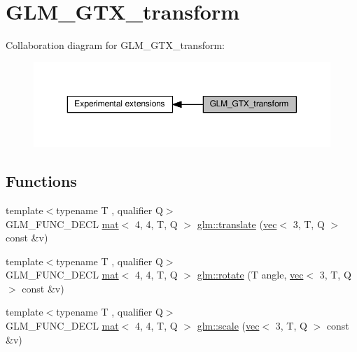 \hypertarget{group__gtx__transform}{}\section{G\+L\+M\+\_\+\+G\+T\+X\+\_\+transform}
\label{group__gtx__transform}
Collaboration diagram for G\+L\+M\+\_\+\+G\+T\+X\+\_\+transform\+:
\nopagebreak
\begin{figure}[H]
\begin{center}
\leavevmode
\includegraphics[width=350pt]{d5/da3/group__gtx__transform}
\end{center}
\end{figure}
\subsection*{Functions}
\begin{DoxyCompactItemize}
\item 
{\footnotesize template$<$typename T , qualifier Q$>$ }\\G\+L\+M\+\_\+\+F\+U\+N\+C\+\_\+\+D\+E\+CL \hyperlink{structglm_1_1mat}{mat}$<$ 4, 4, T, Q $>$ \hyperlink{group__gtx__transform_ga309a30e652e58c396e2c3d4db3ee7658}{glm\+::translate} (\hyperlink{structglm_1_1vec}{vec}$<$ 3, T, Q $>$ const \&v)
\item 
{\footnotesize template$<$typename T , qualifier Q$>$ }\\G\+L\+M\+\_\+\+F\+U\+N\+C\+\_\+\+D\+E\+CL \hyperlink{structglm_1_1mat}{mat}$<$ 4, 4, T, Q $>$ \hyperlink{group__gtx__transform_gaf599be4c0e9d99be1f9cddba79b6018b}{glm\+::rotate} (T angle, \hyperlink{structglm_1_1vec}{vec}$<$ 3, T, Q $>$ const \&v)
\item 
{\footnotesize template$<$typename T , qualifier Q$>$ }\\G\+L\+M\+\_\+\+F\+U\+N\+C\+\_\+\+D\+E\+CL \hyperlink{structglm_1_1mat}{mat}$<$ 4, 4, T, Q $>$ \hyperlink{group__gtx__transform_gafbeefee8fec884d566e4ada0049174d7}{glm\+::scale} (\hyperlink{structglm_1_1vec}{vec}$<$ 3, T, Q $>$ const \&v)
\end{DoxyCompactItemize}


